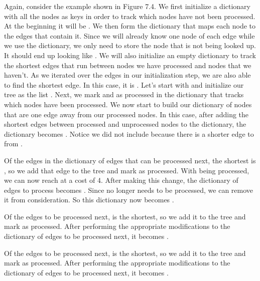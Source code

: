 Again, consider the example shown in Figure 7.4.
We first initialize a dictionary with all the nodes as keys in order to track which nodes have not been processed.
At the beginning it will be .
We then form the dictionary that maps each node to the edges that contain it.
Since we will already know one node of each edge while we use the dictionary, we only need to store the node that is not being looked up.
It should end up looking like .
We will also initialize an empty dictionary to track the shortest edges that run between nodes we have processed and nodes that we haven't.
As we iterated over the edges in our initialization step, we are also able to find the shortest edge.
In this case, it is .
Let's start with  and initialize our tree as the list \li{[(D, C, 1)]}.
Next, we mark  and  as processed in the dictionary that tracks which nodes have been processed.
We now start to build our dictionary of nodes that are one edge away from our processed nodes.
In this case, after adding the shortest edges between processed and unprocessed nodes to the dictionary, the dictionary becomes .
Notice we did not include  because there is a shorter edge to  from .

Of the edges in the dictionary of edges that can be processed next, the shortest is , so we add that edge to the tree and mark  as processed.
With  being processed, we can now reach  at a cost of 4.
After making this change, the dictionary of edges to process becomes .
Since  no longer needs to be processed, we can remove it from consideration. 
So this dictionary now becomes .

Of the edges to be processed next,  is the shortest, so we add it to the tree and mark  as processed.
After performing the appropriate modifications to the dictionary of edges to be processed next, it becomes .

Of the edges to be processed next,  is the shortest, so we add it to the tree and mark  as processed.
After performing the appropriate modifications to the dictionary of edges to be processed next, it becomes .


